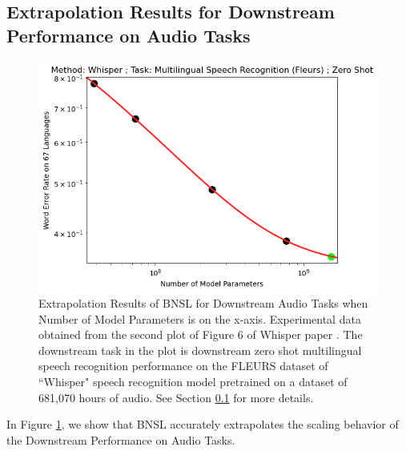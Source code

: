 \documentclass{article} %
\begin{document}
\subsection{Extrapolation Results for Downstream Performance on Audio Tasks}
\label{section:extrapolate_audio}

\begin{figure}[htbp]
    \centering
\includegraphics[width=1.0\textwidth]{figures/audio/whisper__parameter_scaling.png}

    \caption{
Extrapolation Results of BNSL for Downstream Audio Tasks when Number of Model Parameters is on the x-axis. Experimental data obtained from the second plot of Figure 6 of Whisper paper \citep{radford2022robust}. The downstream task in the plot is downstream zero shot multilingual speech recognition performance on the FLEURS dataset of ``Whisper" speech recognition model pretrained on a dataset of 681,070 hours of audio. See Section \ref{section:extrapolate_audio} for more details.
    }
    \label{fig:extrapolate_audio}
\end{figure}

In Figure \ref{fig:extrapolate_audio}, we show that BNSL accurately extrapolates the scaling behavior of the Downstream Performance on Audio Tasks.

\clearpage

\end{document}

